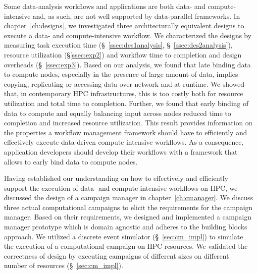 Some data-analysis workflows and applications are both data- and 
compute-intensive and, as such, are not well supported by data-parallel 
frameworks. In chapter~\ref{ch:designs}, we investigated three architecturally 
equivalent designs to execute a data- and compute-intensive workflow. We 
characterized the designs by measuring task execution time 
(\S~\ref{ssec:des1analysis}, \S~\ref{ssec:des2analysis}), resource utilization 
(\S\ref{ssec:exp2}) and workflow time to completion and design overheads 
(\S~\ref{ssec:exp3}). Based on our analysis, we found that late binding data to 
compute nodes, especially in the presence of large amount of data, implies 
copying, replicating or accessing data over network and at runtime. We showed 
that, in contemporary HPC infrastructures, this is too costly both for resource 
utilization and total time to completion. Further, we found that early binding 
of data to compute and equally balancing input across nodes reduced time to 
completion and increased resource utilization. This result provides information 
on the properties a workflow management framework should have to efficiently 
and effectively execute data-driven compute intensive workflows. As a 
consequence, application developers should develop their workflows with a 
framework that allows to early bind data to compute nodes.

Having established our understanding on how to effectively and efficiently
support the execution of data- and compute-intensive workflows on HPC, we 
discussed the design of a campaign manager in chapter~\ref{ch:cmanager}. We 
discuss three actual computational campaigns to elicit the requirements for the 
campaign manager. Based on their requirements, we designed and implemented a 
campaign manager prototype which is domain agnostic and adheres to the building 
blocks approach. We utilized a discrete event simulator (\S~\ref{sec:cm_impl}) 
to simulate the execution of a computational campaign on HPC resources. We 
validated the correctness of design by executing campaigns of different sizes 
on different number of resources (\S~\ref{sec:cm_impl}).

